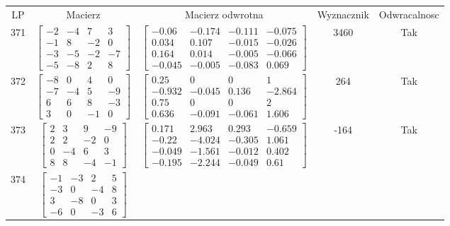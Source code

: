 \documentclass[a4paper,12pt]{article}
\begin{document}
\bgroup {} \vspace{0.2in} \begin{tabular}{c c c c c}
LP & Macierz & Macierz odwrotna & Wyznacznik & Odwracalnosc\\
371
&
$\begin{bmatrix} -2 & -4 & 7 & 3 \\ -1 & 8 & -2 & 0 \\ -3 & -5 & -2 & -7 \\ -5 & -8 & 2 & 8 \end{bmatrix}$
&
$\begin{bmatrix} -0.06 & -0.174 & -0.111 & -0.075 \\ 0.034 & 0.107 & -0.015 & -0.026 \\ 0.164 & 0.014 & -0.005 & -0.066 \\ -0.045 & -0.005 & -0.083 & 0.069 \end{bmatrix}$
&
3460
&
Tak
\\
372
&
$\begin{bmatrix} -8 & 0 & 4 & 0 \\ -7 & -4 & 5 & -9 \\ 6 & 6 & 8 & -3 \\ 3 & 0 & -1 & 0 \end{bmatrix}$
&
$\begin{bmatrix} 0.25 & 0 & 0 & 1 \\ -0.932 & -0.045 & 0.136 & -2.864 \\ 0.75 & 0 & 0 & 2 \\ 0.636 & -0.091 & -0.061 & 1.606 \end{bmatrix}$
&
264
&
Tak
\\
373
&
$\begin{bmatrix} 2 & 3 & 9 & -9 \\ 2 & 2 & -2 & 0 \\ 0 & -4 & 6 & 3 \\ 8 & 8 & -4 & -1 \end{bmatrix}$
&
$\begin{bmatrix} 0.171 & 2.963 & 0.293 & -0.659 \\ -0.22 & -4.024 & -0.305 & 1.061 \\ -0.049 & -1.561 & -0.012 & 0.402 \\ -0.195 & -2.244 & -0.049 & 0.61 \end{bmatrix}$
&
-164
&
Tak
\\
374
&
$\begin{bmatrix} -1 & -3 & 2 & 5 \\ -3 & 0 & -4 & 8 \\ 3 & -8 & 0 & 3 \\ -6 & 0 & -3 & 6 \end{bmatrix}$

\end{tabular}
\end{document}
